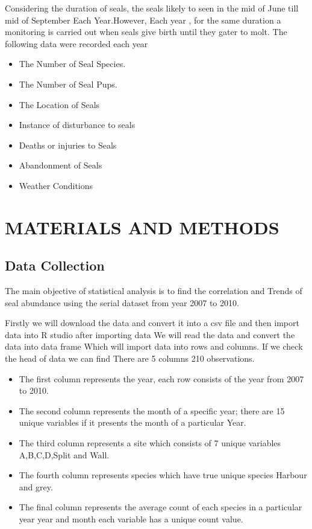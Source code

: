 \documentclass[
]{article}
\providecommand{\tightlist}{%
  \setlength{\itemsep}{0pt}\setlength{\parskip}{0pt}}
\begin{document}
Considering the duration of seals, the seals likely to seen in the mid
of June till mid of September Each Year.However, Each year , for the
same duration a monitoring is carried out when seals give birth until
they gater to molt. The following data were recorded each year

\begin{itemize}
\tightlist
\item
  The Number of Seal Species.
\item
  The Number of Seal Pups.
\item
  The Location of Seals
\item
  Instance of disturbance to seals
\item
  Deaths or injuries to Seals
\item
  Abandonment of Seals
\item
  Weather Conditions
\end{itemize}

\hypertarget{materials-and-methods}{%
\section{MATERIALS AND METHODS}\label{materials-and-methods}}

\hypertarget{data-collection}{%
\subsection{Data Collection}\label{data-collection}}

The main objective of statistical analysis is to find the correlation
and Trends of seal abundance using the serial dataset from year 2007 to
2010.

Firstly we will download the data and convert it into a csv file and
then import data into R studio after importing data We will read the
data and convert the data into data frame Which will import data into
rows and columns. If we check the head of data we can find There are 5
columns 210 observations.

\begin{itemize}
\tightlist
\item
  The first column represents the year, each row consists of the year
  from 2007 to 2010.
\item
  The second column represents the month of a specific year; there are
  15 unique variables if it presents the month of a particular Year.
\item
  The third column represents a site which consists of 7 unique
  variables A,B,C,D,Split and Wall.
\item
  The fourth column represents species which have true unique species
  Harbour and grey.
\item
  The final column represents the average count of each species in a
  particular year year and month each variable has a unique count value.
\end{itemize}
\end{document}
